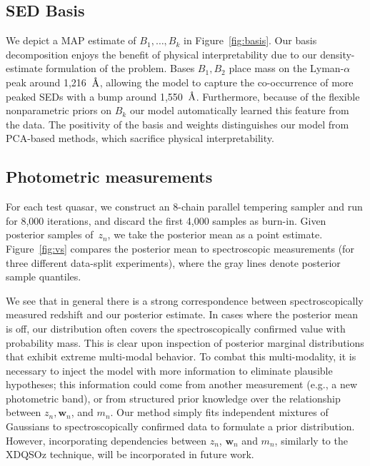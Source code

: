 \documentclass{article} %
\begin{document}
\subsection{SED Basis}
We depict a MAP estimate of $B_1, \dots, B_k$ in Figure~\ref{fig:basis}.
Our basis decomposition enjoys the benefit of physical interpretability due to our density-estimate formulation of the problem.
Bases $B_1, B_2$ place mass on the Lyman-$\alpha$ peak around 1,216~$\textup{\AA}$, allowing the model to capture the co-occurrence of more peaked SEDs with a bump around 1,550~$\textup{\AA}$.  
Furthermore, because of the flexible nonparametric priors on $B_k$ our model automatically learned this feature from the data.
The positivity of the basis and weights distinguishes our model from PCA-based methods, which sacrifice physical interpretability.   

\subsection{Photometric measurements}
For each test quasar, we construct an 8-chain parallel tempering sampler and run for 8,000 iterations, and discard the first 4,000 samples as burn-in. 
Given posterior samples of~$z_n$, we take the posterior mean as a point estimate.  
Figure~\ref{fig:vs} compares the posterior mean to spectroscopic measurements (for three different data-split experiments), where the gray lines denote posterior sample quantiles. 

We see that in general there is a strong correspondence between spectroscopically measured redshift and our posterior estimate.
In cases where the posterior mean is off, our distribution often covers the spectroscopically confirmed value with probability mass.
This is clear upon inspection of posterior marginal distributions that exhibit extreme multi-modal behavior.  
To combat this multi-modality, it is necessary to inject the model with more information to eliminate plausible hypotheses; this information could come from another measurement (e.g., a new photometric band), or from structured prior knowledge over the relationship between $z_n, \mathbf{w}_n$, and $m_n$.  Our method simply fits independent mixtures of Gaussians to spectroscopically confirmed data to formulate a prior distribution.  However, incorporating dependencies between $z_n$, $\mathbf{w}_n$ and $m_n$, similarly to the XDQSOz technique, will be incorporated in future work. 
\end{document}
